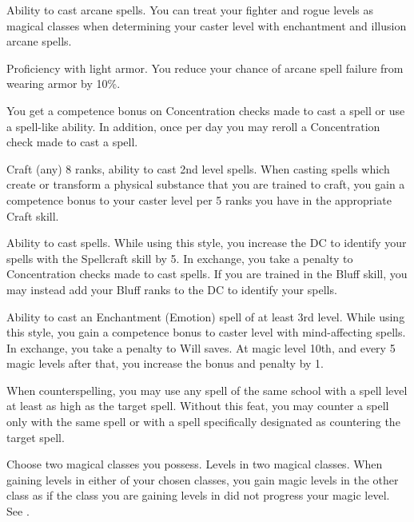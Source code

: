 \featpre Ability to cast arcane spells.
\featben You can treat your fighter and rogue levels as magical classes when determining your caster level with enchantment and illusion arcane spells.

\featpre Proficiency with light armor.
\featben You reduce your chance of arcane spell failure from wearing armor by 10\%. 

 You get a  competence bonus on Concentration checks made to cast a spell or use a spell-like ability. In addition, once per day you may reroll a Concentration check made to cast a spell.

\featpres Craft (any) 8 ranks, ability to cast 2nd level spells.
\featben When casting spells which create or transform a physical substance that you are trained to craft, you gain a  competence bonus to your caster level per 5 ranks you have in the appropriate Craft skill.

\featpre Ability to cast spells.
\featben While using this style, you increase the DC to identify your spells with the Spellcraft skill by 5. In exchange, you take a  penalty to Concentration checks made to cast spells. If you are trained in the Bluff skill, you may instead add your Bluff ranks to the DC to identify your spells.

\featpre Ability to cast an Enchantment (Emotion) spell of at least 3rd level.
\featben While using this style, you gain a  competence bonus to caster level with mind-affecting spells. In exchange, you take a  penalty to Will saves. At magic level 10th, and every 5 magic levels after that, you increase the bonus and penalty by 1.

 When counterspelling, you may use any spell of the same school with a spell level at least as high as the target spell.
 Without this feat, you may counter a spell only with the same spell or with a spell specifically designated as countering the target spell.

Choose two magical classes you possess.
 Levels in two magical classes.
 When gaining levels in either of your chosen classes, you gain magic levels in the other class as if the class you are gaining levels in did not progress your magic level. See .

